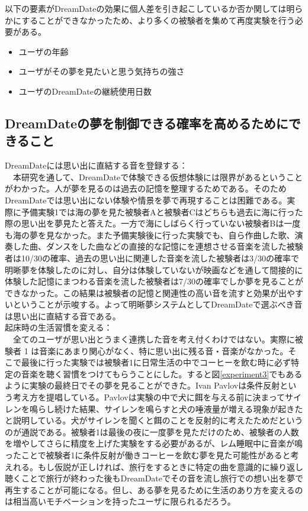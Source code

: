 以下の要素がDreamDateの効果に個人差を引き起こしているか否か関しては明らかにすることができなかったため、より多くの被験者を集めて再度実験を行う必要がある。
\begin{itemize}
\item ユーザの年齢
\item ユーザがその夢を見たいと思う気持ちの強さ
\item ユーザのDreamDateの継続使用日数
\end{itemize}

\subsection{DreamDateの夢を制御できる確率を高めるためにできること}
DreamDateには思い出に直結する音を登録する：\\
　本研究を通して、DreamDateで体験できる仮想体験には限界があるということがわかった。人が夢を見るのは過去の記憶を整理するためである。そのためDreamDateでは思い出にない体験や情景を夢で再現することは困難である。実際に予備実験1では海の夢を見た被験者Aと被験者Cはどちらも過去に海に行った際の思い出を夢見たと答えた。一方で海にしばらく行っていない被験者Bは一度も海の夢を見なかった。また予備実験後に行った実験でも、自ら作曲した歌、演奏した曲、ダンスをした曲などの直接的な記憶にを連想させる音楽を流した被験者は10/30の確率、過去の思い出に関連した音楽を流した被験者は3/30の確率で明晰夢を体験したのに対し、自分は体験していないが映画などを通して間接的に体験した記憶にまつわる音楽を流した被験者は7/30の確率でしか夢を見ることができなかった。この結果は被験者の記憶と関連性の高い音を流すと効果が出やすいということが示唆する。よって明晰夢システムとしてDreamDateで選ぶべき音は思い出に直結する音である。\\

起床時の生活習慣を変える：\\
　全てのユーザが思い出とうまく連携した音を考え付くわけではない。実際に被験者 1 は音楽にあまり関心がなく、特に思い出に残る音・音楽がなかった。そこで最後に行った実験では被験者1に日常生活の中でコーヒーを飲む時に必ず特定の音楽を聴く習慣をつけてもらうことにした。すると図\ref{experiment3}でもあるように実験の最終日でその夢を見ることができた。Ivan Pavlovは条件反射という考え方を提唱している\cite{pavlov}。Pavlovは実験の中で犬に餌を与える前に決まってサイレンを鳴らし続けた結果、サイレンを鳴らすと犬の唾液量が増える現象が起きたと説明している。犬がサイレンを聞くと餌のことを反射的に考えたためだというのが通説である。被験者1は最後の夜に一度夢を見ただけのため、被験者の人数を増やしてさらに精度を上げた実験をする必要があるが、レム睡眠中に音楽が鳴ったことで被験者1に条件反射が働きコーヒーを飲む夢を見た可能性があると考えれる。もし仮説が正しければ、旅行をするときに特定の曲を意識的に繰り返し聴くことで旅行が終わった後もDreamDateでその音を流し旅行での想い出を夢で再生することが可能になる。但し、ある夢を見るために生活のあり方を変えるのは相当高いモチベーションを持ったユーザに限られるだろう。\\

